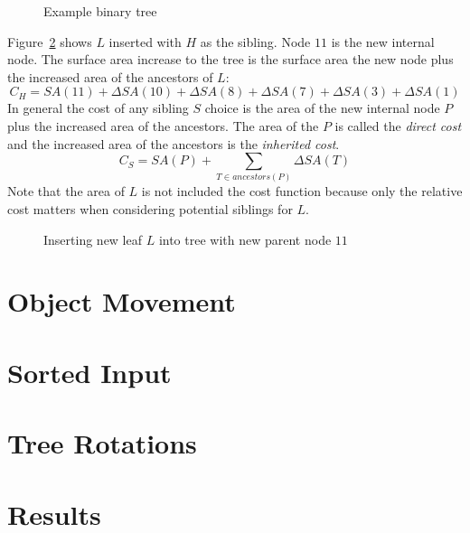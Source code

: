\documentclass{article}
\begin{document}
\begin{figure}
	\begin{center}
		
	\end{center}
	\caption{Example binary tree}
	\label{fig:example_tree}
\end{figure}

Figure~\ref{fig:insert_leaf} shows $L$ inserted with $H$ as the sibling. Node $11$ is the new internal node. The surface area increase to the tree is the surface area the new node plus the increased area of the ancestors of $L$:
\begin{equation}
	C_H = SA(11) + \Delta SA(10) + \Delta SA(8) + \Delta SA(7) + \Delta SA(3) + \Delta SA(1)
\end{equation}
In general the cost of any sibling $S$ choice is the area of the new internal node $P$ plus the increased area of the ancestors. The area of the $P$ is called the \emph{direct cost} and the increased area of the ancestors is the \emph{inherited cost}.
\[ C_S = SA(P) + \sum_{T \in ancestors(P)} \Delta SA(T) \]
Note that the area of $L$ is not included the cost function because only the relative cost matters when considering potential siblings for $L$.

\begin{figure}
	\begin{center}
		
	\end{center}
	\caption{Inserting new leaf $L$ into tree with new parent node $11$}
	\label{fig:insert_leaf}
\end{figure}

\section{Object Movement}

\section{Sorted Input}

\section{Tree Rotations}

\section{Results}
\end{document}
